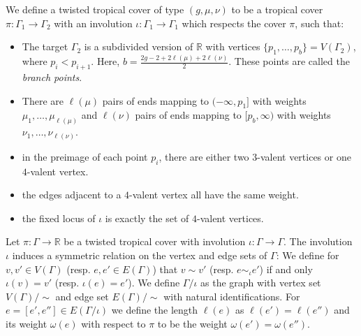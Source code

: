 \documentclass[ALCO,published]{cedram}
\begin{document}
\begin{defi}\label{def-twistedtropcover}
We define a twisted tropical cover of type $(g,\mu,\nu)$ to be a tropical cover $\pi\colon\Gamma_1\to\Gamma_2$ with an involution $\iota\colon\Gamma_1\to\Gamma_1$ which respects the cover $\pi$, such that:
\begin{itemize}
    \item The target $\Gamma_2$ is a subdivided version of $\mathbb{R}$ with vertices $\{p_1,\dots,p_b\}=V(\Gamma_2)$, where $p_i<p_{i+1}$. Here, $b=\frac{2g-2+2\ell(\mu)+2\ell(\nu)}{2}$. These points are called the \emph{branch points}.
    \item There are $\ell(\mu)$ pairs of ends mapping to $(-\infty,p_1]$ with weights $\mu_1,\dots,\mu_{\ell(\mu)}$ and $\ell(\nu)$ pairs of ends mapping to $[p_b,\infty)$ with weights $\nu_1,\ldots,\nu_{\ell(\nu)}$.
    \item in the preimage of each point $p_i$, there are either two $3$-valent vertices or one $4$-valent vertex.
    \item the edges adjacent to a $4$-valent vertex all have the same weight.
    \item the fixed locus of $\iota$ is exactly the set of $4$-valent vertices.
\end{itemize}
\end{defi}

\begin{defi}
Let $\pi\colon \Gamma\to \mathbb{R}$ be a twisted tropical cover with involution $\iota\colon\Gamma\to\Gamma$. The involution $\iota$ induces a symmetric relation on the vertex and edge sets of $\Gamma$: We define for $v,v'\in V(\Gamma)$  (resp. $e,e'\in E(\Gamma)$) that $v\sim v'$ (resp. $e\sim_\iota e'$) if and only $\iota(v)=v'$ (resp. $\iota(e)=e'$). We define $\Gamma/\iota$ as the graph with vertex set $V(\Gamma)/\sim$ and edge set $E(\Gamma)/\sim$ with natural identifications. For $e=[e',e'']\in E(\Gamma/\iota)$ we define the length $\ell(e)$ as $\ell(e')=\ell(e'')$ and its weight $\omega(e)$ with respect to $\pi$ to be the weight $\omega(e')=\omega(e'')$.
\end{defi}
\end{document}
